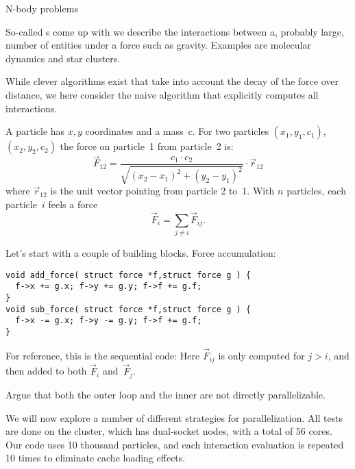 
 {N-body problems}

So-called s come up with
we describe the interactions between a,
probably large,
number of entities under a force such as gravity.
Examples are molecular dynamics and star clusters.

While clever algorithms exist that take into account the
decay of the force over distance,
we here consider the naive algorithm that
explicitly computes all interactions.

A particle has $x,y$ coordinates and a mass~$c$.
For two particles $(x_1,y_1,c_1)$, $(x_2,y_2,c_2)$
the force on particle~1 from particle~2 is:
\[ \overrightarrow F_{12} = \frac{c_1\cdot c_2}{\sqrt{ (x_2-x_1)^2+(y_2-y_1)^2 }} \cdot \overrightarrow r_{12} \]
where $\overrightarrow r_{12}$ is the unit vector pointing from particle 2 to~1.
With $n$ particles, each particle~$i$ feels a force
\[ \overrightarrow F_i = \sum_{j\not=i} \overrightarrow F_{ij}.\]

Let's start with a couple of building blocks.
Force accumulation:
\begin{lstlisting}
void add_force( struct force *f,struct force g ) {
  f->x += g.x; f->y += g.y; f->f += g.f;
}
void sub_force( struct force *f,struct force g ) {
  f->x -= g.x; f->y -= g.y; f->f += g.f;
}
\end{lstlisting}

For reference, this is the sequential code:
Here $\overrightarrow F_{ij}$ is only computed for $j>i$, and then
added to both $\overrightarrow F_i$ and~$\overrightarrow F_j$.

\begin{exercise}
  Argue that both the outer loop and the inner are not directly parallelizable.
\end{exercise}

We will now explore a number of different strategies for parallelization.
All tests are done on the  cluster,
which has dual-socket  nodes,
with a total of 56 cores.
Our code uses 10 thousand particles, and each interaction evaluation
is repeated 10 times to eliminate cache loading effects.

